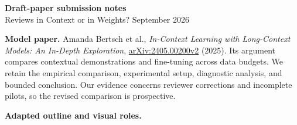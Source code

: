 \documentclass[10pt,letterpaper]{article}
\begin{document}
\setcounter{page}{4}
\begin{center}
{\Large\bfseries Draft-paper submission notes}\\[3pt]
Reviews in Context or in Weights? September 2026
\end{center}

\textbf{Model paper.}
Amanda Bertsch et al., \emph{In-Context Learning with Long-Context Models: An In-Depth Exploration},
\href{https://arxiv.org/html/2405.00200v2}{arXiv:2405.00200v2} (2025).
Its argument compares contextual demonstrations and fine-tuning across data budgets.
We retain the empirical comparison, experimental setup, diagnostic analysis, and
bounded conclusion. Our evidence concerns reviewer corrections and incomplete
pilots, so the revised comparison is prospective.

\textbf{Adapted outline and visual roles.}
\end{document}

